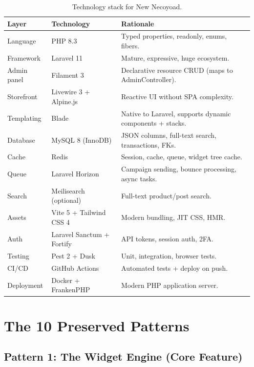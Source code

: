 \documentclass[11pt,a4paper]{article}
\begin{document}
\begin{table}[htbp]
\centering
\caption{Technology stack for New Necoyoad.}\label{tab:stack}
\footnotesize\sloppy
\begin{tabularx}{\columnwidth}{>{\raggedright\arraybackslash}p{3.0cm}lX}
\toprule
\textbf{Layer} & \textbf{Technology} & \textbf{Rationale} \\
\midrule
Language & PHP 8.3 & Typed properties, readonly, enums, fibers. \\
Framework & Laravel 11 & Mature, expressive, huge ecosystem. \\
Admin panel & Filament 3 & Declarative resource CRUD (maps to AdminController). \\
Storefront & Livewire 3 + Alpine.js & Reactive UI without SPA complexity. \\
Templating & Blade & Native to Laravel, supports dynamic components + stacks. \\
Database & MySQL 8 (InnoDB) & JSON columns, full-text search, transactions, FKs. \\
Cache & Redis & Session, cache, queue, widget tree cache. \\
Queue & Laravel Horizon & Campaign sending, bounce processing, async tasks. \\
Search & Meilisearch (optional) & Full-text product/post search. \\
Assets & Vite 5 + Tailwind CSS 4 & Modern bundling, JIT CSS, HMR. \\
Auth & Laravel Sanctum + Fortify & API tokens, session auth, 2FA. \\
Testing & Pest 2 + Dusk & Unit, integration, browser tests. \\
CI/CD & GitHub Actions & Automated tests + deploy on push. \\
Deployment & Docker + FrankenPHP & Modern PHP application server. \\
\bottomrule
\end{tabularx}
\end{table}

\section{The 10 Preserved Patterns}\label{sec:preserved}

\subsection{Pattern 1: The Widget Engine (Core Feature)}
\end{document}
